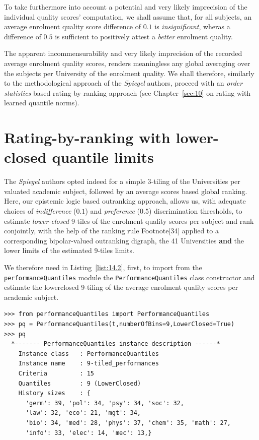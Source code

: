 To take furthermore into account a potential and very likely imprecision of the individual quality scores' computation, we shall assume that, for all subjects, an average enrolment quality score difference of $0.1$ is \emph{insignificant}, wheras a difference of $0.5$ is sufficient to positively attest a \emph{better} enrolment quality.

The apparent incommensurability and very likely imprecision of the recorded average enrolment quality scores, renders meaningless any global averaging over the subjects per University of the enrolment quality. We shall therefore, similarly to the methodological approach of the \emph{Spiegel} authors, proceed with an \emph{order statistics} based rating-by-ranking approach (see Chapter~\vref{sec:10} on rating with learned quantile norms).

\section{Rating-by-ranking with lower-closed quantile limits}
\label{sec:14.1}

The \emph{Spiegel} authors opted indeed for a simple 3-tiling of the Universities per valuated academic subject, followed by an average \Borda scores based global ranking. Here, our epistemic logic based outranking approach, allows us, with adequate choices of \emph{indifference} ($0.1$) and \emph{preference} ($0.5$) discrimination thresholds, to estimate \emph{lower-closed} 9-tiles of the enrolment quality scores per subject and rank conjointly, with the help of the \Copeland ranking rule Footnote[34] applied to a corresponding bipolar-valued outranking digraph, the 41 Universities \textbf{and} the lower limits of the estimated 9-tiles limits.

We therefore need in Listing~\vref{list:14.2}, first, to import from the \texttt{performanceQuantiles} module the \texttt{PerformanceQuantiles} class constructor  and estimate the lowerclosed 9-tiling of the average enrolment quality scores per academic subject.
\begin{lstlisting}[caption={Computing 9-tiles of the enrolment quality scores per subject},label=list:14.2]
>>> from performanceQuantiles import PerformanceQuantiles
>>> pq = PerformanceQuantiles(t,numberOfBins=9,LowerClosed=True)
>>> pq
  *------- PerformanceQuantiles instance description ------*
    Instance class   : PerformanceQuantiles
    Instance name    : 9-tiled_performances
    Criteria         : 15
    Quantiles        : 9 (LowerClosed)
    History sizes    : {
      'germ': 39, 'pol': 34, 'psy': 34, 'soc': 32,
      'law': 32, 'eco': 21, 'mgt': 34,
      'bio': 34, 'med': 28, 'phys': 37, 'chem': 35, 'math': 27,
      'info': 33, 'elec': 14, 'mec': 13,}
\end{lstlisting}

